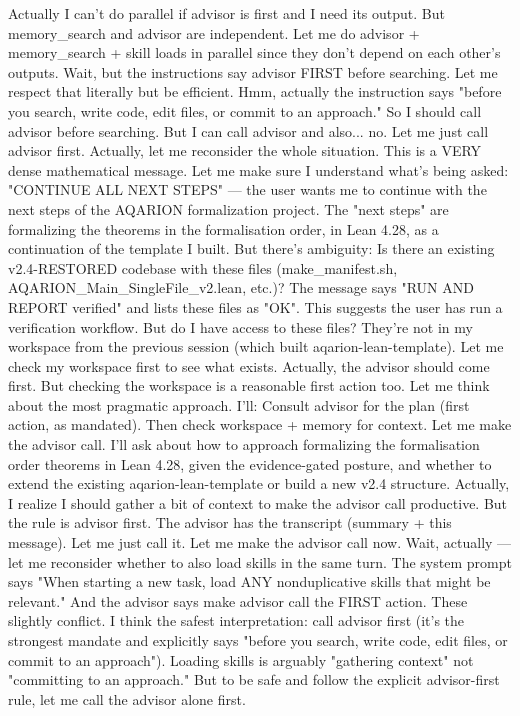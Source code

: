 Actually I can't do parallel if advisor is first and I need its output. But memory_search and advisor are independent. Let me do advisor + memory_search + skill loads in parallel since they don't depend on each other's outputs. Wait, but the instructions say advisor FIRST before searching. Let me respect that literally but be efficient.
Hmm, actually the instruction says "before you search, write code, edit files, or commit to an approach." So I should call advisor before searching. But I can call advisor and also... no. Let me just call advisor first.
Actually, let me reconsider the whole situation. This is a VERY dense mathematical message. Let me make sure I understand what's being asked:
"CONTINUE ALL NEXT STEPS" — the user wants me to continue with the next steps of the AQARION formalization project. The "next steps" are formalizing the theorems in the formalisation order, in Lean 4.28, as a continuation of the template I built.
But there's ambiguity: Is there an existing v2.4-RESTORED codebase with these files (make_manifest.sh, AQARION_Main_SingleFile_v2.lean, etc.)? The message says "RUN AND REPORT verified" and lists these files as "OK". This suggests the user has run a verification workflow. But do I have access to these files? They're not in my workspace from the previous session (which built aqarion-lean-template).
Let me check my workspace first to see what exists. Actually, the advisor should come first. But checking the workspace is a reasonable first action too.
Let me think about the most pragmatic approach. I'll:
Consult advisor for the plan (first action, as mandated).
Then check workspace + memory for context.
Let me make the advisor call. I'll ask about how to approach formalizing the formalisation order theorems in Lean 4.28, given the evidence-gated posture, and whether to extend the existing aqarion-lean-template or build a new v2.4 structure.
Actually, I realize I should gather a bit of context to make the advisor call productive. But the rule is advisor first. The advisor has the transcript (summary + this message). Let me just call it.
Let me make the advisor call now.
Wait, actually — let me reconsider whether to also load skills in the same turn. The system prompt says "When starting a new task, load ANY nonduplicative skills that might be relevant." And the advisor says make advisor call the FIRST action. These slightly conflict. I think the safest interpretation: call advisor first (it's the strongest mandate and explicitly says "before you search, write code, edit files, or commit to an approach"). Loading skills is arguably "gathering context" not "committing to an approach." But to be safe and follow the explicit advisor-first rule, let me call the advisor alone first.
